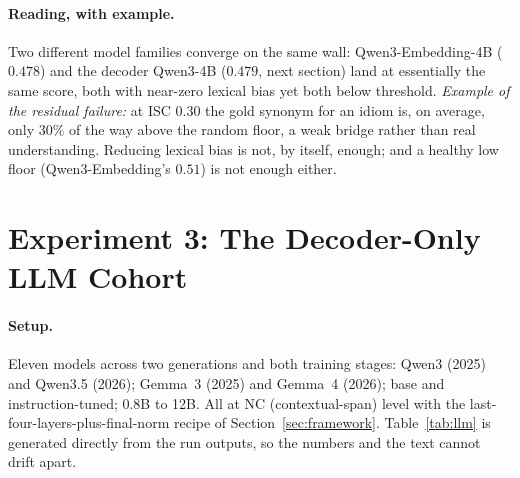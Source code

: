 \documentclass[11pt]{article}
\begin{document}
\paragraph{Reading, with example.} Two different model families converge on the same wall:
Qwen3-Embedding-4B ($0.478$) and the decoder Qwen3-4B ($0.479$, next section) land at essentially
the same score, both with near-zero lexical bias yet both below threshold. \emph{Example of the
residual failure:} at ISC $0.30$ the gold synonym for an idiom is, on average, only $30\%$ of the way
above the random floor, a weak bridge rather than real understanding. Reducing lexical bias is not,
by itself, enough; and a healthy low floor (Qwen3-Embedding's $0.51$) is not enough either.

\section{Experiment 3: The Decoder-Only LLM Cohort}
\label{sec:exp3}

\paragraph{Setup.} Eleven models across two generations and both training stages: Qwen3 (2025) and
Qwen3.5 (2026); Gemma~3 (2025) and Gemma~4 (2026); base and instruction-tuned; 0.8B to 12B. All at
NC (contextual-span) level with the last-four-layers-plus-final-norm recipe of
Section~\ref{sec:framework}. Table~\ref{tab:llm} is generated directly from the run outputs, so the
numbers and the text cannot drift apart.

\begin{table}[H]
\centering
\small

\caption{Decoder-only LLMs on English NCIMP (mean over contexts), sorted by ICS. Threshold $=0.55$.
The instruction-tuned Gemma~4-12B is discussed below; its high ICS is an anisotropy artefact, not
genuine capture (note its FLOOR of $0.95$).}
\label{tab:llm}
\end{table}
\end{document}

